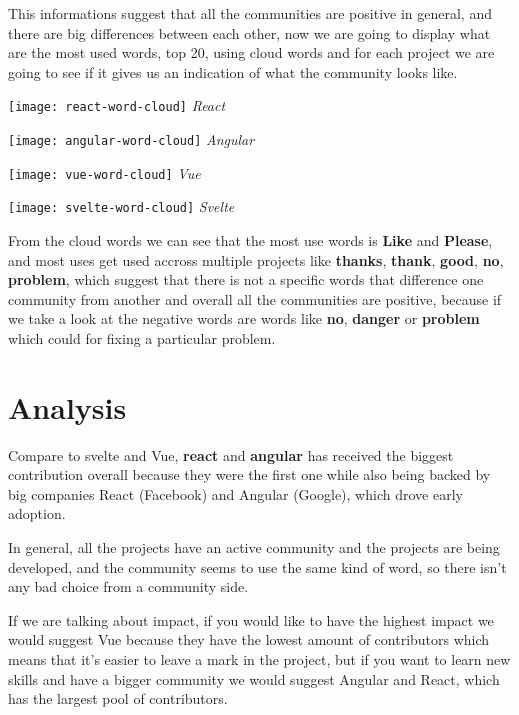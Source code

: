 This informations suggest that all the communities are positive in general, and there are big differences between each other, now we are going to display what are the most used words, top 20, using cloud words and for each project we are going to see if it gives us an indication of what the community looks like.

\begin{center}
    \texttt{[image: react-word-cloud]}    
    \textit{React}
\end{center}


\begin{center}
    \texttt{[image: angular-word-cloud]}    
    \textit{Angular}
\end{center}


\begin{center}
    \texttt{[image: vue-word-cloud]}    
    \textit{Vue}
\end{center}

\begin{center}
    \texttt{[image: svelte-word-cloud]}    
    \textit{Svelte}
\end{center}

From the cloud words we can see that the most use words is \textbf{Like} and \textbf{Please}, and most uses get used accross multiple projects like \textbf{thanks}, \textbf{thank}, \textbf{good}, \textbf{no}, \textbf{problem}, which suggest that there is not a specific words that difference one community from another and overall all the communities are positive, because if we take a look at the negative words are words like \textbf{no}, \textbf{danger} or \textbf{problem} which could for fixing a particular problem.

\section{Analysis}
Compare to svelte and Vue, \textbf{react} and \textbf{angular} has received the biggest contribution overall because they were the first one while also being backed by big companies React (Facebook) and Angular (Google), which drove early adoption.

In general, all the projects have an active community and the projects are being developed, and the community seems to use the same kind of word, so there isn't any bad choice from a community side.

If we are talking about impact, if you would like to have the highest impact we would suggest Vue because they have the lowest amount of contributors which means that it's easier to leave a mark in the project, but if you want to learn new skills and have a bigger community we would suggest Angular and React, which has the largest pool of contributors.

